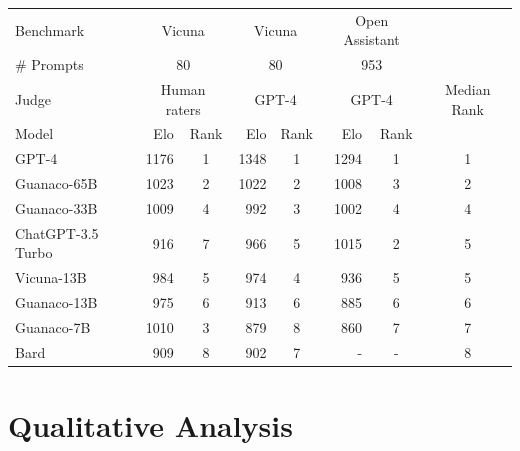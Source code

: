 \documentclass{article}
\begin{document}
\begin{table}[]
\begin{tabular}{lrcrcrcc}\toprule
Benchmark & \multicolumn{2}{c}{Vicuna} & \multicolumn{2}{c}{Vicuna} & \multicolumn{2}{c}{Open Assistant} &  \\
\# Prompts & \multicolumn{2}{c}{80} & \multicolumn{2}{c}{80} & \multicolumn{2}{c}{953} &  \\
Judge & \multicolumn{2}{c}{Human raters} & \multicolumn{2}{c}{GPT-4} & \multicolumn{2}{c}{GPT-4} & Median Rank\\
\cmidrule{2-7} 
Model & Elo & Rank & Elo & Rank & Elo & Rank & \\
\cmidrule{1-8} 
GPT-4 &             1176 &  1 & 1348 & 1 & 1294 & 1 & 1\\%
Guanaco-65B &       1023 &  2 & 1022 & 2 & 1008 & 3 & 2\\%
Guanaco-33B &       1009 &  4 & 992 &  3 & 1002 & 4 & 4\\%
ChatGPT-3.5 Turbo & 916 &   7 & 966 &  5 & 1015 & 2 & 5\\%
Vicuna-13B &        984 &   5 & 974 &  4 & 936  & 5 & 5\\%
Guanaco-13B &       975 &   6 & 913 &  6 & 885  & 6 & 6\\%
Guanaco-7B &        1010 &  3 & 879 &  8 & 860 & 7 & 7\\%
Bard &              909 &   8 & 902 &  7 &  - & - & 8\\%

\bottomrule
\end{tabular}

\end{table}

\section{Qualitative Analysis}
\end{document}
